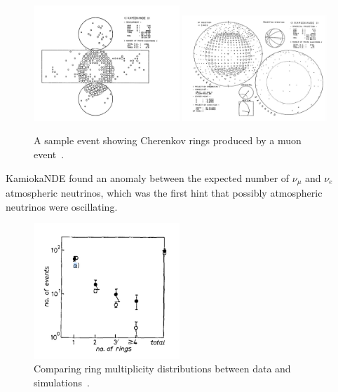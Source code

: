 \begin{figure}[h!]
\centering
  \centering
\includegraphics[width=0.49\textwidth]{figures/Kamioka2.jpeg}
\includegraphics[width=0.49\textwidth]{figures/Kamioka3.jpeg}
\vspace{2mm}
\caption{A sample event showing Cherenkov rings produced by a muon event~\cite{58KAMIOKA}.}
\label{fig:Kam2}
\end{figure}
KamiokaNDE found an anomaly between the expected number of $\nu_\mu$ and $\nu_e$ atmospheric neutrinos, which was the first hint that possibly atmospheric neutrinos were oscillating.
\begin{figure}[h!]
\centering
  \centering
\includegraphics[width=0.49\textwidth]{figures/Kamioka4.jpeg}
\vspace{2mm}
\caption{Comparing ring multiplicity distributions between data and simulations~\cite{59KAMIOKA}.}
\label{fig:Kam3}
\end{figure}

